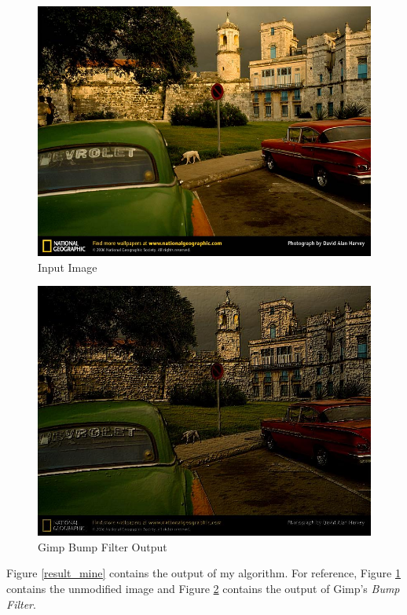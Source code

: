 \documentclass[12pt]{article}
\begin{document}
\begin{figure}
\centering
\includegraphics[width=1.00\textwidth]{car.png}
\caption{Input Image}
\label{original}
\end{figure}

\begin{figure}
\centering
\includegraphics[width=1.00\textwidth]{car21.png}
\caption{Gimp Bump Filter Output}
\label{result_gimp}
\end{figure}


Figure \ref{result_mine} contains the output of my algorithm. For reference, Figure \ref{original} contains the unmodified image and Figure \ref{result_gimp} contains the output of Gimp's \emph{Bump Filter}.
\end{document}
